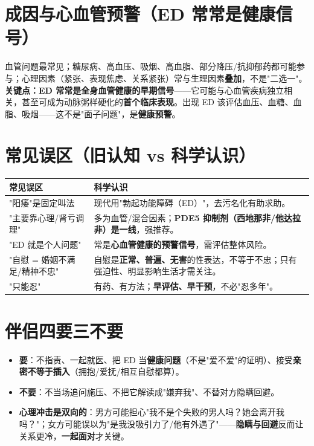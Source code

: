 \documentclass[12pt,UTF8,openany]{ctexbook}
\begin{document}
\section{成因与心血管预警（ED 常常是健康信号）}
血管问题最常见；糖尿病、高血压、吸烟、高血脂、部分降压/抗抑郁药都可能参与；心理因素（紧张、表现焦虑、关系紧张）常与生理因素\textbf{叠加}，不是"二选一"。
\textbf{关键点：ED 常常是全身血管健康的早期信号}——它可能与心血管疾病独立相关，甚至可成为动脉粥样硬化的\textbf{首个临床表现}。出现 ED 该评估血压、血糖、血脂、吸烟——这不是"面子问题"，是\textbf{健康预警}。

\section{常见误区（旧认知 vs 科学认识）}
\begin{tabularx}{\textwidth}{l X}
\toprule
\textbf{常见误区} & \textbf{科学认识} \\
\midrule
"阳痿"是固定叫法 & 现代用"勃起功能障碍（ED）"，去污名化有助求助。 \\
"主要靠心理/肾亏调理" & 多为血管/混合因素；\textbf{PDE5 抑制剂（西地那非/他达拉非）是一线}，强推荐。 \\
"ED 就是个人问题" & 常是\textbf{心血管健康的预警信号}，需评估整体风险。 \\
"自慰 = 婚姻不满足/精神不忠" & 自慰是\textbf{正常、普遍、无害}的性表达，不等于不忠；只有强迫性、明显影响生活才需关注。 \\
"只能忍" & 有药、有方法；\textbf{早评估、早干预}，不必"忍多年"。 \\
\bottomrule
\end{tabularx}

\section{伴侣四要三不要}
\begin{itemize}[leftmargin=2em,itemsep=0.3em]
  \item \textbf{要}：不指责、一起就医、把 ED 当\textbf{健康问题}（不是"爱不爱"的证明）、接受\textbf{亲密不等于插入}（拥抱/爱抚/相互自慰都算）。
  \item \textbf{不要}：不当场追问施压、不把它解读成"嫌弃我"、不替对方隐瞒回避。
  \item \textbf{心理冲击是双向的}：男方可能担心"我不是个失败的男人吗？她会离开我吗？"；女方可能误以为"是我没吸引力了/他有外遇了"——\textbf{隐瞒与回避}反而让关系更冷，\textbf{一起面对}才关键。
\end{itemize}
\end{document}

